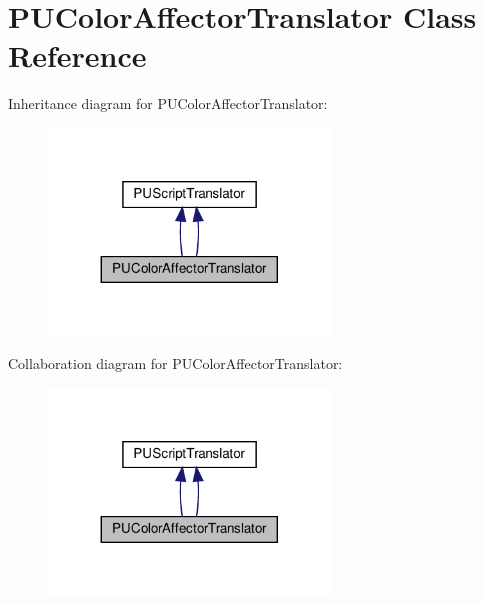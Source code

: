 \hypertarget{classPUColorAffectorTranslator}{}\section{P\+U\+Color\+Affector\+Translator Class Reference}
\label{classPUColorAffectorTranslator}


Inheritance diagram for P\+U\+Color\+Affector\+Translator\+:
\nopagebreak
\begin{figure}[H]
\begin{center}
\leavevmode
\includegraphics[width=212pt]{classPUColorAffectorTranslator__inherit__graph}
\end{center}
\end{figure}


Collaboration diagram for P\+U\+Color\+Affector\+Translator\+:
\nopagebreak
\begin{figure}[H]
\begin{center}
\leavevmode
\includegraphics[width=212pt]{classPUColorAffectorTranslator__coll__graph}
\end{center}
\end{figure}
